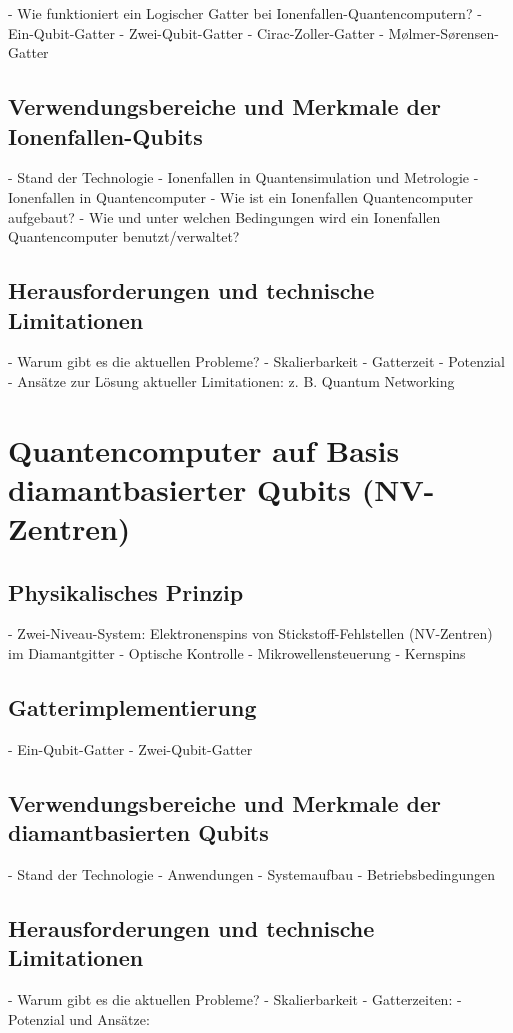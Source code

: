     - Wie funktioniert ein Logischer Gatter bei Ionenfallen-Quantencomputern?
    - Ein-Qubit-Gatter
    - Zwei-Qubit-Gatter
    - Cirac-Zoller-Gatter
    - Mølmer-Sørensen-Gatter
\subsection{Verwendungsbereiche und Merkmale der Ionenfallen-Qubits}
    - Stand der Technologie
    - Ionenfallen in Quantensimulation und Metrologie
    - Ionenfallen in Quantencomputer
    - Wie ist ein Ionenfallen Quantencomputer aufgebaut?
    - Wie und unter welchen Bedingungen wird ein Ionenfallen Quantencomputer benutzt/verwaltet?
\subsection{Herausforderungen und technische Limitationen}
    - Warum gibt es die aktuellen Probleme?
    - Skalierbarkeit
    - Gatterzeit
    - Potenzial
    - Ansätze zur Lösung aktueller Limitationen: z. B. Quantum Networking 

\section{Quantencomputer auf Basis diamantbasierter Qubits (NV-Zentren)}
\subsection{Physikalisches Prinzip}
    - Zwei-Niveau-System: Elektronenspins von Stickstoff-Fehlstellen (NV-Zentren) im Diamantgitter
    - Optische Kontrolle
    - Mikrowellensteuerung
    - Kernspins
\subsection{Gatterimplementierung}
    - Ein-Qubit-Gatter
    - Zwei-Qubit-Gatter
\subsection{Verwendungsbereiche und Merkmale der diamantbasierten Qubits}
    - Stand der Technologie
    - Anwendungen
    - Systemaufbau
    - Betriebsbedingungen
\subsection{Herausforderungen und technische Limitationen}
    - Warum gibt es die aktuellen Probleme?
    - Skalierbarkeit
    - Gatterzeiten:
    - Potenzial und Ansätze:



